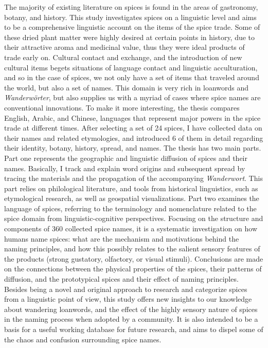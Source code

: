 The majority of existing literature on spices is found in the areas of gastronomy, botany, and history. This study investigates spices on a linguistic level and aims to be a comprehensive linguistic account on the items of the spice trade. Some of these dried plant matter were highly desired at certain points in history, due to their attractive aroma and medicinal value, thus they were ideal products of trade early on. Cultural contact and exchange, and the introduction of new cultural items begets situations of language contact and linguistic acculturation, and so in the case of spices, we not only have a set of items that traveled around the world, but also a set of names. This domain is very rich in loanwords and \textit{Wanderwörter}, but also supplies us with a myriad of cases where spice names are conventional innovations. To make it more interesting, the thesis compares English, Arabic, and Chinese, languages that represent major powers in the spice trade at different times. After selecting a set of 24 spices, I have collected data on their names and related etymologies, and introduced 6 of them in detail regarding their identity, botany, history, spread, and names. The thesis has two main parts. Part one represents the geographic and linguistic diffusion of spices and their names. Basically, I track and explain word origins and subsequent spread by tracing the materials and the propagation of the accompanying \textit{Wanderwort}. This part relies on philological literature, and tools from historical linguistics, such as etymological research, as well as geospatial visualizations. Part two examines the language of spices, referring to the terminology and nomenclature related to the spice domain from linguistic-cognitive perspectives. Focusing on the structure and components of 360 collected spice names, it is a systematic investigation on how humans name spices: what are the mechanism and motivations behind the naming principles, and how this possibly relates to the salient sensory features of the products (strong gustatory, olfactory, or visual stimuli). Conclusions are made on the connections between the physical properties of the spices, their patterns of diffusion, and the prototypical spices and their effect of naming principles. Besides being a novel and original approach to research and categorize spices from a linguistic point of view, this study offers new insights to our knowledge about wandering loanwords, and the effect of the highly sensory nature of spices in the naming process when adopted by a community. It is also intended to be a basis for a useful working database for future research, and aims to dispel some of the chaos and confusion surrounding spice names.

\relax
{}\relax